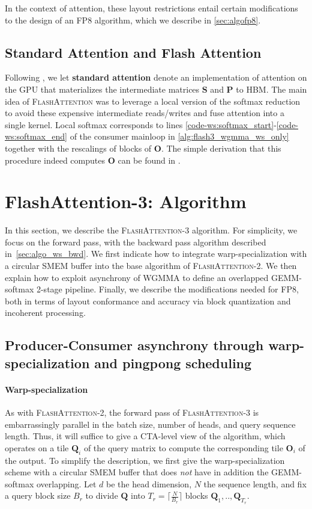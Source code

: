 In the context of attention, these layout restrictions entail certain modifications to the design of an FP8 algorithm, which we describe in \cref{sec:algofp8}.

\subsection{Standard Attention and Flash Attention} Following \citet{dao2022flashattention}, we let \textbf{standard attention} denote an implementation of attention on the GPU that materializes the intermediate matrices $\mathbf{S}$ and $\mathbf{P}$ to HBM. The main idea of \textsc{FlashAttention} was to leverage a local version of the softmax reduction to avoid these expensive intermediate reads/writes and fuse attention into a single kernel. Local softmax corresponds to lines \ref{code-ws:softmax_start}-\ref{code-ws:softmax_end} of the consumer mainloop in \cref{alg:flash3_wgmma_ws_only} together with the rescalings of blocks of $\mathbf{O}$. The simple derivation that this procedure indeed computes $\mathbf{O}$ can be found in \cite[\S 2.3.1]{dao2023flashattention2}.

\section{FlashAttention-3: Algorithm}
\label{sec:algo}

In this section, we describe the \textsc{FlashAttention-3} algorithm. For simplicity, we focus on the forward pass, with the backward pass algorithm described in~\cref{sec:algo_ws_bwd}. We first indicate how to integrate warp-specialization with a circular SMEM buffer into the base algorithm of \textsc{FlashAttention-2}. We then explain how to exploit asynchrony of WGMMA to define an overlapped GEMM-softmax 2-stage pipeline. Finally, we describe the modifications needed for FP8, both in terms of layout conformance and accuracy via block quantization and incoherent processing.

\subsection{Producer-Consumer asynchrony through warp-specialization and pingpong scheduling}
\label{sec:algo_ws}

\paragraph{Warp-specialization}
As with \textsc{FlashAttention-2}, the forward pass of \textsc{FlashAttention-3} is embarrassingly parallel in the batch size, number of heads, and query sequence length. Thus, it will suffice to give a CTA-level view of the algorithm, which operates on a tile $\mathbf{Q}_i$ of the query matrix to compute the corresponding tile $\mathbf{O}_i$ of the output. To simplify the description, we first give the warp-specialization scheme with a circular SMEM buffer that does \emph{not} have in addition the GEMM-softmax overlapping. Let $d$ be the head dimension, $N$ the sequence length, and fix a query block size $B_r$ to divide $\mathbf{Q}$ into $T_r = \lceil \frac{N}{B_r} \rceil$ blocks $\mathbf{Q}_1, .., \mathbf{Q}_{T_r}$.

